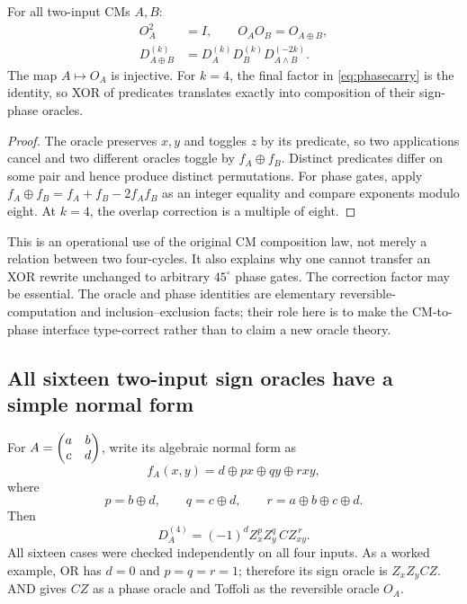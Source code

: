 \begin{proposition}\label{thm:compiler}
For all two-input CMs $A,B$:
\begin{align}
 O_A^2&=I,\qquad O_AO_B=O_{A\oplus B},\label{eq:oraclehom}\\
 D_{A\oplus B}^{(k)}
 &=D_A^{(k)}D_B^{(k)}D_{A\land B}^{(-2k)}.\label{eq:phasecarry}
\end{align}
The map $A\mapsto O_A$ is injective. For $k=4$, the final factor in \cref{eq:phasecarry} is the identity, so XOR of predicates translates exactly into composition of their sign-phase oracles.
\end{proposition}
\begin{proof}
The oracle preserves $x,y$ and toggles $z$ by its predicate, so two applications cancel and two different oracles toggle by $f_A\oplus f_B$. Distinct predicates differ on some pair and hence produce distinct permutations. For phase gates, apply $f_A\oplus f_B=f_A+f_B-2f_Af_B$ as an integer equality and compare exponents modulo eight. At $k=4$, the overlap correction is a multiple of eight.
\end{proof}
This is an operational use of the original CM composition law, not merely a relation between two four-cycles. It also explains why one cannot transfer an XOR rewrite unchanged to arbitrary $45^\circ$ phase gates. The correction factor may be essential.  The oracle and phase identities are elementary reversible-computation and inclusion--exclusion facts; their role here is to make the CM-to-phase interface type-correct rather than to claim a new oracle theory.

\subsection{All sixteen two-input sign oracles have a simple normal form}
For $A=\begin{pmatrix}a&b\\c&d\end{pmatrix}$, write its algebraic normal form as
\begin{equation}
 f_A(x,y)=d\oplus p x\oplus q y\oplus rxy,
\end{equation}
where
\begin{equation}
 p=b\oplus d,\qquad q=c\oplus d,\qquad r=a\oplus b\oplus c\oplus d.
\end{equation}
Then
\begin{equation}\label{eq:ANForacle}
 D_A^{(4)}=(-1)^d Z_x^p Z_y^q\,CZ_{xy}^{\,r}.
\end{equation}
All sixteen cases were checked independently on all four inputs. As a worked example, OR has $d=0$ and $p=q=r=1$; therefore its sign oracle is $Z_xZ_yCZ$. AND gives $CZ$ as a phase oracle and Toffoli as the reversible oracle $O_A$.

